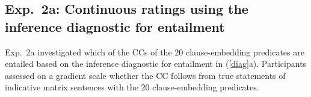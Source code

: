 \documentclass[11pt,fleqn]{article}
\newcommand{\6}{\mbox{$[\hspace*{-.6mm}[$}}
\newcommand{\9}{\mbox{$]\hspace*{-.6mm}]$}}
\begin{document}
%
%
%
%

\subsection{Exp.~2a: Continuous ratings using the inference diagnostic for entailment}\label{s31}

Exp.~2a investigated which of the CCs of the 20 clause-embedding predicates are entailed based on the inference diagnostic for entailment in (\ref{diag}a). Participants assessed on a gradient scale whether the CC follows from true statements of indicative matrix sentences with the 20 clause-embedding predicates.

\end{document}
